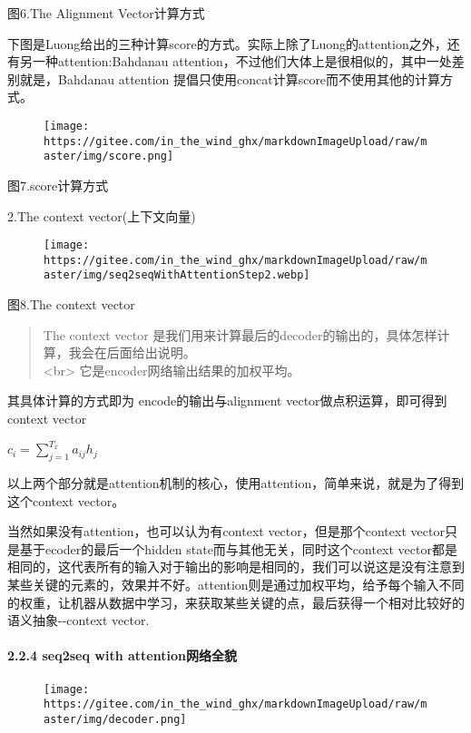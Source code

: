 \documentclass[
]{article}
\begin{document}
图6.The Alignment Vector计算方式

下图是Luong给出的三种计算score的方式。实际上除了Luong的attention之外，还有另一种attention:Bahdanau
attention，不过他们大体上是很相似的，其中一处差别就是，Bahdanau
attention 提倡只使用concat计算score而不使用其他的计算方式。

\begin{figure}
\centering
\texttt{[image: https://gitee.com/in\_the\_wind\_ghx/markdownImageUpload/raw/master/img/score.png]}
\caption{}
\end{figure}

图7.score计算方式

2.The context vector(上下文向量)

\begin{figure}
\centering
\texttt{[image: https://gitee.com/in\_the\_wind\_ghx/markdownImageUpload/raw/master/img/seq2seqWithAttentionStep2.webp]}
\caption{}
\end{figure}

图8.The context vector

\begin{quote}
The context vector
是我们用来计算最后的decoder的输出的，具体怎样计算，我会在后面给出说明。\\
\textless br\textgreater{} 它是encoder网络输出结果的加权平均。
\end{quote}

其具体计算的方式即为 encode的输出与alignment
vector做点积运算，即可得到context vector

\(c_i=\sum_{j=1}^{T_x}a_{ij}h_j\)

以上两个部分就是attention机制的核心，使用attention，简单来说，就是为了得到这个context
vector。

当然如果没有attention，也可以认为有context vector，但是那个context
vector只是基于ecoder的最后一个hidden state而与其他无关，同时这个context
vector都是相同的，这代表所有的输入对于输出的影响是相同的，我们可以说这是没有注意到某些关键的元素的，效果并不好。attention则是通过加权平均，给予每个输入不同的权重，让机器从数据中学习，来获取某些关键的点，最后获得一个相对比较好的语义抽象-\/-context
vector.

\hypertarget{header-n64}{%
\paragraph{2.2.4 seq2seq with attention网络全貌}\label{header-n64}}

\begin{figure}
\centering
\texttt{[image: https://gitee.com/in\_the\_wind\_ghx/markdownImageUpload/raw/master/img/decoder.png]}
\caption{}
\end{figure}
\end{document}
